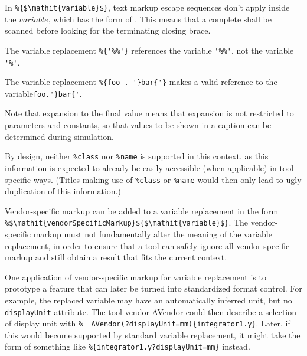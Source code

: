 In \lstinline!%{$\mathit{variable}$}!, text markup escape sequences don't apply inside the $\mathit{variable}$, which has the form of .
This means that a complete  shall be scanned before looking for the terminating closing brace.

\begin{example}
The variable replacement \lstinline!%{'%%'}! references the variable \lstinline!'%%'!, not the variable \lstinline!'%'!.
\end{example}

\begin{example}
The variable replacement \lstinline!%{foo . '}bar{'}! makes a valid reference to the variable\linebreak[4] \lstinline!foo.'}bar{'!.
\end{example}

Note that expansion to the final value means that expansion is not restricted to parameters and constants, so that values to be shown in a caption can be determined during simulation.

\begin{nonnormative}
By design, neither \lstinline!%class! nor \lstinline!%name! is supported in this context, as this information is expected to already be easily accessible (when applicable) in tool-specific ways.
(Titles making use of \lstinline!%class! or \lstinline!%name! would then only lead to ugly duplication of this information.)
\end{nonnormative}

Vendor-specific markup can be added to a variable replacement in the form \lstinline!%$\mathit{vendorSpecificMarkup}${$\mathit{variable}$}!.
The vendor-specific markup must not fundamentally alter the meaning of the variable replacement, in order to ensure that a tool can safely ignore all vendor-specific markup and still obtain a result that fits the current context.

\begin{example}
One application of vendor-specific markup for variable replacement is to prototype a feature that can later be turned into standardized format control.
For example, the replaced variable may have an automatically inferred unit, but no \lstinline!displayUnit!-attribute.
The tool vendor AVendor could then describe a selection of display unit with \lstinline!%__AVendor(?displayUnit=mm){integrator1.y}!.
Later, if this would become supported by standard variable replacement, it might take the form of something like \lstinline!%{integrator1.y?displayUnit=mm}! instead.
\end{example}

